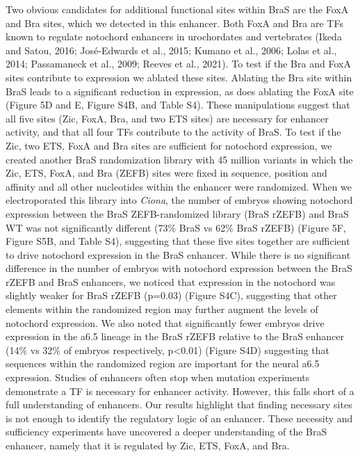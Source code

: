 Two obvious candidates for additional functional sites within BraS are the FoxA and Bra sites, which we detected in this enhancer. Both FoxA and Bra are TFs known to regulate notochord enhancers in urochordates and vertebrates (Ikeda and Satou, 2016; José-Edwards et al., 2015; Kumano et al., 2006; Lolas et al., 2014; Passamaneck et al., 2009; Reeves et al., 2021). To test if the Bra and FoxA sites contribute to expression we ablated these sites. Ablating the Bra site within BraS leads to a significant reduction in expression, as does ablating the FoxA site (Figure 5D and E, Figure S4B, and Table S4). These manipulations suggest that all five sites (Zic, FoxA, Bra, and two ETS sites) are necessary for enhancer activity, and that all four TFs contribute to the activity of BraS.  
To test if the Zic, two ETS, FoxA and Bra sites are sufficient for notochord expression, we created another BraS randomization library with 45 million variants in which the Zic, ETS, FoxA, and Bra (ZEFB) sites were fixed in sequence, position and affinity and all other nucleotides within the enhancer were randomized. When we electroporated this library into \textit{Ciona}, the number of embryos showing notochord expression between the BraS ZEFB-randomized library (BraS rZEFB) and BraS WT was not significantly different (73\% BraS vs 62\% BraS rZEFB) (Figure 5F, Figure S5B, and Table S4), suggesting that these five sites together are sufficient to drive notochord expression in the BraS enhancer. While there is no significant difference in the number of embryos with notochord expression between the BraS rZEFB and BraS enhancers, we noticed that expression in the notochord was slightly weaker for BraS rZEFB (p=0.03) (Figure S4C), suggesting that other elements within the randomized region may further augment the levels of notochord expression. We also noted that significantly fewer embryos drive expression in the a6.5 lineage in the BraS rZEFB relative to the BraS enhancer (14\% vs 32\% of embryos respectively, p<0.01) (Figure S4D) suggesting that sequences within the randomized region are important for the neural a6.5 expression. Studies of enhancers often stop when mutation experiments demonstrate a TF is necessary for enhancer activity. However, this falls short of a full understanding of enhancers. Our results highlight that finding necessary sites is not enough to identify the regulatory logic of an enhancer. These necessity and sufficiency experiments have uncovered a deeper understanding of the BraS enhancer, namely that it is regulated by Zic, ETS, FoxA, and Bra.

